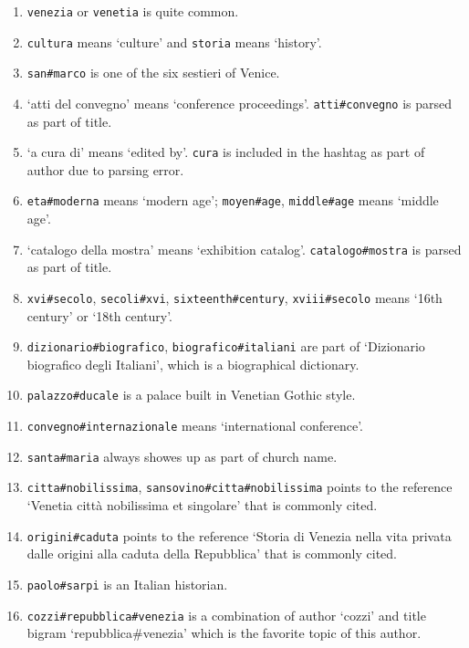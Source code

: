 \documentclass[11pt]{article}
\providecommand{\tightlist}{%
      \setlength{\itemsep}{0pt}\setlength{\parskip}{0pt}}
\begin{document}
    \begin{enumerate}
\def\labelenumi{\arabic{enumi}.}
\tightlist
\item
  \texttt{venezia} or \texttt{venetia} is quite common.
\item
  \texttt{cultura} means `culture' and \texttt{storia} means `history'.
\item
  \texttt{san\#marco} is one of the six sestieri of Venice.
\item
  `atti del convegno' means `conference proceedings'.
  \texttt{atti\#convegno} is parsed as part of title.
\item
  `a cura di' means `edited by'. \texttt{cura} is included in the
  hashtag as part of author due to parsing error.
\item
  \texttt{eta\#moderna} means `modern age'; \texttt{moyen\#age},
  \texttt{middle\#age} means `middle age'.
\item
  `catalogo della mostra' means `exhibition catalog'.
  \texttt{catalogo\#mostra} is parsed as part of title.
\item
  \texttt{xvi\#secolo}, \texttt{secoli\#xvi},
  \texttt{sixteenth\#century}, \texttt{xviii\#secolo} means `16th
  century' or `18th century'.
\item
  \texttt{dizionario\#biografico}, \texttt{biografico\#italiani} are
  part of `Dizionario biografico degli Italiani', which is a
  biographical dictionary.
\item
  \texttt{palazzo\#ducale} is a palace built in Venetian Gothic style.
\item
  \texttt{convegno\#internazionale} means `international conference'.
\item
  \texttt{santa\#maria} always showes up as part of church name.
\item
  \texttt{citta\#nobilissima}, \texttt{sansovino\#citta\#nobilissima}
  points to the reference `Venetia città nobilissima et singolare' that
  is commonly cited.
\item
  \texttt{origini\#caduta} points to the reference `Storia di Venezia
  nella vita privata dalle origini alla caduta della Repubblica' that is
  commonly cited.
\item
  \texttt{paolo\#sarpi} is an Italian historian.
\item
  \texttt{cozzi\#repubblica\#venezia} is a combination of author `cozzi'
  and title bigram `repubblica\#venezia' which is the favorite topic of
  this author.
\end{enumerate}
\end{document}
